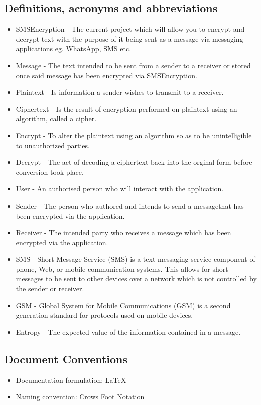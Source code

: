 \subsection{Definitions, acronyms and abbreviations}
\begin{itemize}
\item SMSEncryption - The current project which will allow you to encrypt and decrypt text with the purpose of it being sent as a message via messaging applications eg. WhatsApp, SMS etc.
\item Message - The text intended to be sent from a sender to a receiver  or stored once said message has been encrypted via SMSEncryption.
\item Plaintext -  Is information a sender wishes to transmit to a receiver. 
\item Ciphertext - Is the result of encryption performed on plaintext using an algorithm, called a cipher.
\item Encrypt -  To alter the plaintext using an algorithm so as to be unintelligible to unauthorized parties.
\item Decrypt - The act of decoding a ciphertext back into the orginal form before conversion took place.
\item User - An authorised person who will interact with the application.
\item Sender - The person who authored and intends to send a messagethat has been encrypted via the application.
\item Receiver - The intended party who receives a message which has been encrypted via the application.
\item SMS - Short Message Service (SMS) is a text messaging service component of phone, Web, or mobile communication systems. This allows for short messages to be sent to other devices over a network which is not controlled by the sender or receiver.
\item GSM - Global System for Mobile Communications (GSM) is a second generation standard for protocols used on mobile devices.
\item Entropy -  The expected value of the information contained in a message.
\end{itemize}

\subsection{Document Conventions}
\begin{itemize}
\item Documentation formulation: LaTeX
\item Naming convention: Crows Foot Notation
\end{itemize}

